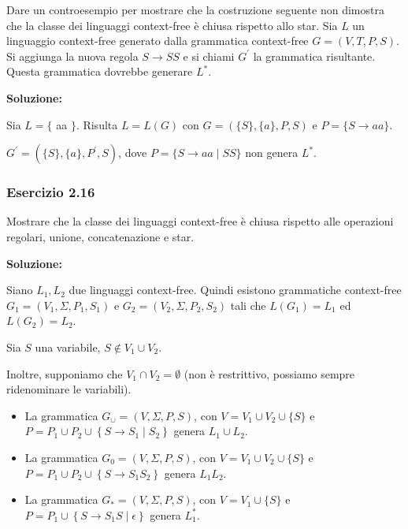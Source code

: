 Dare un controesempio per mostrare che la costruzione seguente non dimostra che la classe dei linguaggi context-free è chiusa rispetto allo star. Sia $L$ un linguaggio context-free generato dalla grammatica context-free $G=(V, T, P, S)$. Si aggiunga la nuova regola $S \rightarrow S S$ e si chiami $G^{\prime}$ la grammatica risultante. Questa grammatica dovrebbe generare $L^{*}$.

\vspace{5mm}

\textbf{Soluzione:}

Sia $L=\{$ aa $\}$. Risulta $L=L(G)$ con $G=(\{S\},\{a\}, P, S)$ e $P=\{S \rightarrow a a\} .$

$G^{\prime}=\left(\{S\},\{a\}, P^{\prime}, S\right)$, dove $P=\{S \rightarrow a a \mid S S\}$ non genera $L^{*}$. 

\subsubsection{Esercizio 2.16}

Mostrare che la classe dei linguaggi context-free è chiusa rispetto
alle operazioni regolari, unione, concatenazione e star.

\vspace{5mm}

\textbf{Soluzione:}

Siano $L_{1}, L_{2}$ due linguaggi context-free. Quindi esistono grammatiche context-free $G_{1}=\left(V_{1}, \Sigma, P_{1}, S_{1}\right)$ e $G_{2}=\left(V_{2}, \Sigma, P_{2}, S_{2}\right)$ tali che $L\left(G_{1}\right)=L_{1}$ ed $L\left(G_{2}\right)=L_{2}$.

Sia $S$ una variabile, $S \notin V_{1} \cup V_{2}$.

Inoltre, supponiamo che $V_{1} \cap V_{2}=\emptyset$ (non è restrittivo, possiamo sempre ridenominare le variabili).

\begin{itemize}
    \item La grammatica $G_{\cup}=(V, \Sigma, P, S)$, con $V=V_{1} \cup V_{2} \cup\{S\}$ e
$P=P_{1} \cup P_{2} \cup\left\{S \rightarrow S_{1} \mid S_{2}\right\}$ genera $L_{1} \cup L_{2} .$
    \item La grammatica $G_{0}=(V, \Sigma, P, S)$, con $V=V_{1} \cup V_{2} \cup\{S\}$ e
$P=P_{1} \cup P_{2} \cup\left\{S \rightarrow S_{1} S_{2}\right\}$ genera $L_{1} L_{2} .$
    \item La grammatica $G_{*}=(V, \Sigma, P, S)$, con $V=V_{1} \cup\{S\}$ e
$P=P_{1} \cup\left\{S \rightarrow S_{1} S \mid \epsilon\right\}$ genera $L_{1}^{*} .$
\end{itemize}

